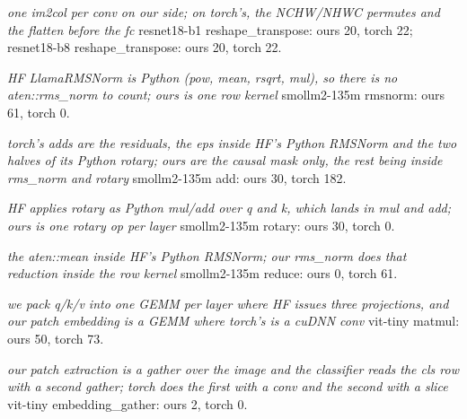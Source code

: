 \begin{minipage}{\linewidth}
\par\smallskip
\emph{one im2col per conv on our side; on torch's, the NCHW/NHWC permutes and the flatten before the fc} resnet18-b1 reshape\_transpose: ours 20, torch 22; resnet18-b8 reshape\_transpose: ours 20, torch 22.
\par\smallskip
\emph{HF LlamaRMSNorm is Python (pow, mean, rsqrt, mul), so there is no aten::rms\_norm to count; ours is one row kernel} smollm2-135m rmsnorm: ours 61, torch 0.
\par\smallskip
\emph{torch's adds are the residuals, the eps inside HF's Python RMSNorm and the two halves of its Python rotary; ours are the causal mask only, the rest being inside rms\_norm and rotary} smollm2-135m add: ours 30, torch 182.
\par\smallskip
\emph{HF applies rotary as Python mul/add over q and k, which lands in mul and add; ours is one rotary op per layer} smollm2-135m rotary: ours 30, torch 0.
\par\smallskip
\emph{the aten::mean inside HF's Python RMSNorm; our rms\_norm does that reduction inside the row kernel} smollm2-135m reduce: ours 0, torch 61.
\par\smallskip
\emph{we pack q/k/v into one GEMM per layer where HF issues three projections, and our patch embedding is a GEMM where torch's is a cuDNN conv} vit-tiny matmul: ours 50, torch 73.
\par\smallskip
\emph{our patch extraction is a gather over the image and the classifier reads the cls row with a second gather; torch does the first with a conv and the second with a slice} vit-tiny embedding\_gather: ours 2, torch 0.
\end{minipage}

